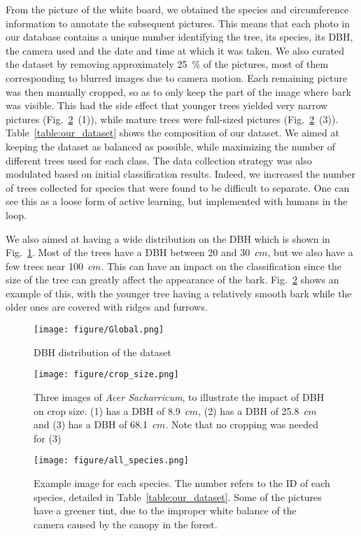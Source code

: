 \documentclass[letterpaper, 10 pt, conference]{ieeeconf}  %
\begin{document}
From the picture of the white board, we obtained the species and circumference information to annotate the subsequent pictures. This means that each photo in our database contains a unique number identifying the tree, its species, its DBH, the camera used and the date and time at which it was taken. We also curated the dataset by removing approximately 25~\% of the pictures, most of them corresponding to blurred images due to camera motion. Each remaining picture was then manually cropped, so as to only keep the part of the image where bark was visible. This had the side effect that younger trees yielded very narrow pictures (Fig.~\ref{fig:dbh}~(1)), while mature trees were full-sized pictures (Fig.~\ref{fig:dbh}~(3)). Table~\ref{table:our_dataset} shows the composition of our dataset. We aimed at keeping the dataset as balanced as possible, while maximizing the number of different trees used for each class. The data collection strategy was also modulated based on initial classification results. Indeed, we increased the number of trees collected for species that were found to be difficult to separate. One can see this as a loose form of active learning, but implemented with humans in the loop.

We also aimed at having a wide distribution on the DBH which is shown in Fig.~\ref{DBH_distribution}. Most of the trees have a DBH between 20 and 30~$cm$, but we also have a few trees near 100~$cm$. This can have an impact on the classification since the size of the tree can greatly affect the appearance of the bark. Fig.~\ref{fig:dbh} shows an example of this, with the younger tree having a relatively smooth bark while the older ones are covered with ridges and furrows.

\begin{figure}[ht]
\centering
\texttt{[image: figure/Global.png]}
\caption{DBH distribution of the dataset}
\label{DBH_distribution}
\end{figure}

\begin{figure}[ht]
\centering
\texttt{[image: figure/crop\_size.png]}
\caption{Three images of \emph{Acer Sacharricum}, to illustrate the impact of DBH on crop size. (1) has a DBH of 8.9~$cm$, (2) has a DBH of 25.8~$cm$ and (3) has a DBH of 68.1~$cm$. Note that no cropping was needed for (3)}
\label{fig:dbh}
\end{figure}

\begin{figure*}[t]
\vspace*{3mm}
\centering
\texttt{[image: figure/all\_species.png]}
\caption{Example image for each species. The number refers to the ID of each species, detailed in Table~\ref{table:our_dataset}. Some of the pictures have a greener tint, due to the improper white balance of the camera caused by the canopy in the forest.}
\label{fig:all_species}
\end{figure*}
\end{document}
